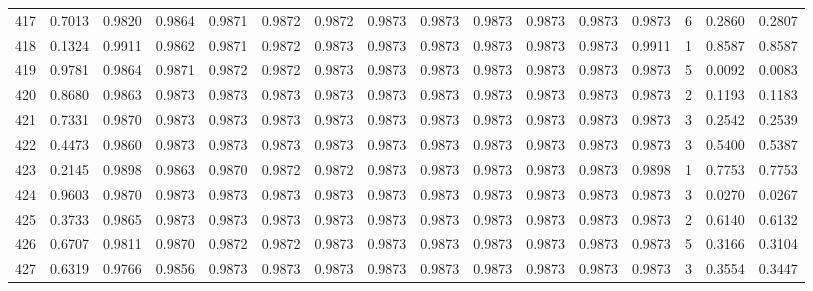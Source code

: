 \begin{tabular}{lrrrrrrrrrrrrrrr}
417 &      0.7013 &  0.9820 &  0.9864 &  0.9871 &  0.9872 &  0.9872 &  0.9873 &  0.9873 &  0.9873 &  0.9873 &   0.9873 &     0.9873 &      6 &                    0.2860 &                     0.2807 \\
418 &      0.1324 &  0.9911 &  0.9862 &  0.9871 &  0.9872 &  0.9873 &  0.9873 &  0.9873 &  0.9873 &  0.9873 &   0.9873 &     0.9911 &      1 &                    0.8587 &                     0.8587 \\
419 &      0.9781 &  0.9864 &  0.9871 &  0.9872 &  0.9872 &  0.9873 &  0.9873 &  0.9873 &  0.9873 &  0.9873 &   0.9873 &     0.9873 &      5 &                    0.0092 &                     0.0083 \\
420 &      0.8680 &  0.9863 &  0.9873 &  0.9873 &  0.9873 &  0.9873 &  0.9873 &  0.9873 &  0.9873 &  0.9873 &   0.9873 &     0.9873 &      2 &                    0.1193 &                     0.1183 \\
421 &      0.7331 &  0.9870 &  0.9873 &  0.9873 &  0.9873 &  0.9873 &  0.9873 &  0.9873 &  0.9873 &  0.9873 &   0.9873 &     0.9873 &      3 &                    0.2542 &                     0.2539 \\
422 &      0.4473 &  0.9860 &  0.9873 &  0.9873 &  0.9873 &  0.9873 &  0.9873 &  0.9873 &  0.9873 &  0.9873 &   0.9873 &     0.9873 &      3 &                    0.5400 &                     0.5387 \\
423 &      0.2145 &  0.9898 &  0.9863 &  0.9870 &  0.9872 &  0.9872 &  0.9873 &  0.9873 &  0.9873 &  0.9873 &   0.9873 &     0.9898 &      1 &                    0.7753 &                     0.7753 \\
424 &      0.9603 &  0.9870 &  0.9873 &  0.9873 &  0.9873 &  0.9873 &  0.9873 &  0.9873 &  0.9873 &  0.9873 &   0.9873 &     0.9873 &      3 &                    0.0270 &                     0.0267 \\
425 &      0.3733 &  0.9865 &  0.9873 &  0.9873 &  0.9873 &  0.9873 &  0.9873 &  0.9873 &  0.9873 &  0.9873 &   0.9873 &     0.9873 &      2 &                    0.6140 &                     0.6132 \\
426 &      0.6707 &  0.9811 &  0.9870 &  0.9872 &  0.9872 &  0.9873 &  0.9873 &  0.9873 &  0.9873 &  0.9873 &   0.9873 &     0.9873 &      5 &                    0.3166 &                     0.3104 \\
427 &      0.6319 &  0.9766 &  0.9856 &  0.9873 &  0.9873 &  0.9873 &  0.9873 &  0.9873 &  0.9873 &  0.9873 &   0.9873 &     0.9873 &      3 &                    0.3554 &                     0.3447 \\

\end{tabular}
